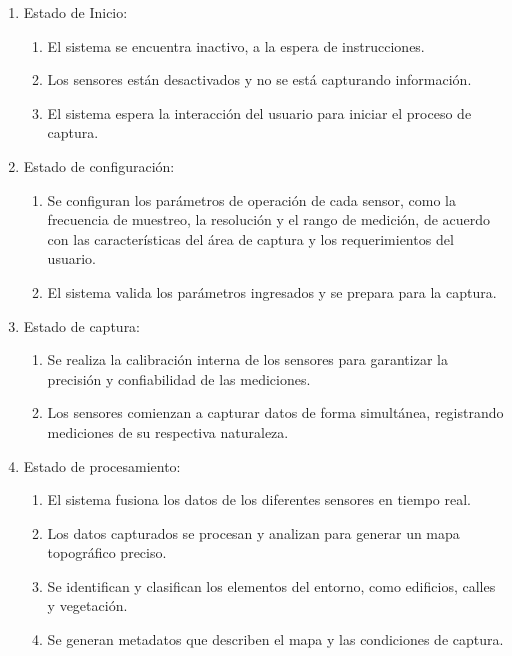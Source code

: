 \documentclass[12pt,a4paper, twoside]{article} %
\begin{document}
\begin{enumerate}

\item Estado de Inicio:

\begin{enumerate}
    \item El sistema se encuentra inactivo, a la espera de instrucciones.
    \item Los sensores están desactivados y no se está capturando información.
    \item El sistema espera la interacción del usuario para iniciar el proceso de captura.
\end{enumerate}

\item Estado de configuración:

\begin{enumerate}
    \item Se configuran los parámetros de operación de cada sensor, como la frecuencia de muestreo, la resolución y el rango de medición, de acuerdo con las características del área de captura y los requerimientos del usuario.

    \item El sistema valida los parámetros ingresados y se prepara para la captura.
\end{enumerate}

\item Estado de captura:

\begin{enumerate}

    \item Se realiza la calibración interna de los sensores para garantizar la precisión y confiabilidad de las mediciones.
     \item Los sensores comienzan a capturar datos de forma simultánea, registrando mediciones de su respectiva naturaleza.

\end{enumerate}

\item Estado de procesamiento:

\begin{enumerate}
    \item El sistema fusiona los datos de los diferentes sensores en tiempo real.
    \item Los datos capturados se procesan y analizan para generar un mapa topográfico preciso.
    \item Se identifican y clasifican los elementos del entorno, como edificios, calles y vegetación.
    \item Se generan metadatos que describen el mapa y las condiciones de captura.
\end{enumerate}


\end{enumerate}
\end{document}
